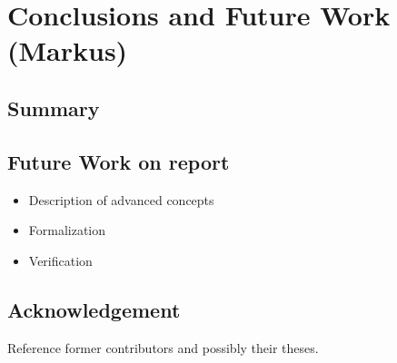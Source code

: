 \chapter{Conclusions and Future Work (Markus)}

\section{Summary}

\section{Future Work on report}
\begin{itemize}
  \item Description of advanced concepts
  \item Formalization
  \item Verification
\end{itemize}

\section*{Acknowledgement}

Reference former contributors and possibly their theses.